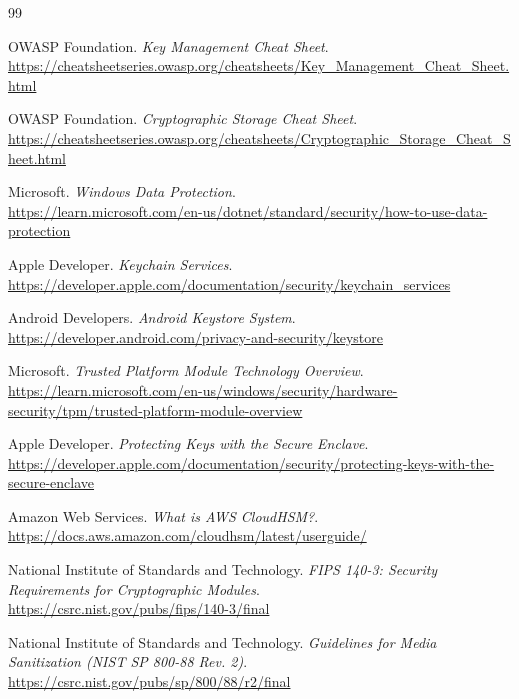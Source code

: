 \documentclass[12pt,a4paper]{article}
\begin{document}
\begin{thebibliography}{99}

    OWASP Foundation.
    \textit{Key Management Cheat Sheet}.
    \\
    \url{https://cheatsheetseries.owasp.org/cheatsheets/Key_Management_Cheat_Sheet.html}

    OWASP Foundation.
    \textit{Cryptographic Storage Cheat Sheet}.
    \\
    \url{https://cheatsheetseries.owasp.org/cheatsheets/Cryptographic_Storage_Cheat_Sheet.html}

    Microsoft.
    \textit{Windows Data Protection}.
    \\
    \url{https://learn.microsoft.com/en-us/dotnet/standard/security/how-to-use-data-protection}

    Apple Developer.
    \textit{Keychain Services}.
    \\
    \url{https://developer.apple.com/documentation/security/keychain_services}

    Android Developers.
    \textit{Android Keystore System}.
    \\
    \url{https://developer.android.com/privacy-and-security/keystore}

    Microsoft.
    \textit{Trusted Platform Module Technology Overview}.
    \\
    \url{https://learn.microsoft.com/en-us/windows/security/hardware-security/tpm/trusted-platform-module-overview}

    Apple Developer.
    \textit{Protecting Keys with the Secure Enclave}.
    \\
    \url{https://developer.apple.com/documentation/security/protecting-keys-with-the-secure-enclave}

    Amazon Web Services.
    \textit{What is AWS CloudHSM?}.
    \\
    \url{https://docs.aws.amazon.com/cloudhsm/latest/userguide/}

    National Institute of Standards and Technology.
    \textit{FIPS 140-3: Security Requirements for Cryptographic Modules}.
    \\
    \url{https://csrc.nist.gov/pubs/fips/140-3/final}

    National Institute of Standards and Technology.
    \textit{Guidelines for Media Sanitization (NIST SP 800-88 Rev. 2)}.
    \\
    \url{https://csrc.nist.gov/pubs/sp/800/88/r2/final}


\end{thebibliography}
\end{document}
